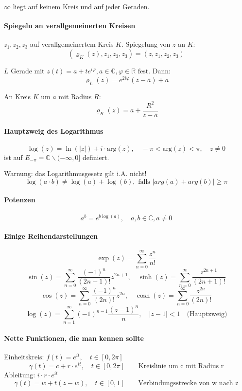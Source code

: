 \documentclass[a4paper, 10pt, DIV20, headings=small]{scrartcl}
\theoremstyle{definition}
\theoremstyle{plain}
\begin{document}
$\infty$ liegt auf keinem Kreis und auf jeder Geraden.

\paragraph{Spiegeln an verallgemeinerten Kreisen}
$z_1,z_2,z_3$ auf verallgemeinertem Kreis $K$. Spiegelung von $z$ an $K$:
$$(\varrho_K(z),z_1,z_3,z_3) = \overline{(z,z_1,z_2,z_3)}$$

$L$ Gerade mit $z(t) = a + t e^{i \varphi}, a \in \mathbb{C}, \varphi \in \mathbb{R} \text{ fest}$.
Dann:
$$\varrho_L(z) = e^{2 i \varphi} (\overline{z} - \overline{a}) + a$$

An Kreis $K$ um $a$ mit Radius $R$:
$$\varrho_K(z) = a + \frac{R^2}{\overline{z}- \overline{a}}$$

\paragraph{Hauptzweig des Logarithmus}
$$\log(z) = \ln(|z|) + i \cdot \text{arg}(z), \quad -\pi < \text{arg}(z) < \pi, \quad z \neq 0$$
ist auf $E_{- \pi} = \mathbb{C} \backslash (-\infty,0]$ definiert.

Warnung: das Logarithmusgesetz gilt i.A. nicht!
$$\log(a \cdot b) \neq \log(a) + \log(b), \text{ falls } |arg(a)+arg(b)| \geq \pi$$

\paragraph{Potenzen}
$$a^b = e^{b \log (a)}, \quad a,b \in \mathbb{C}, a \neq 0$$

\paragraph{Einige Reihendarstellungen}
$$\exp(z) = \sum\limits_{n=0}^\infty{\frac{z^n}{n!}}$$
$$\sin(z) = \sum\limits_{n=0}^\infty{\frac{(-1)^n}{(2n+1)!} z^{2n+1}}, \quad \sinh(z) = \sum\limits_{n=0}^\infty{\frac{z^{2n+1}}{(2n+1)!}}$$
$$\cos(z) = \sum\limits_{n=0}^\infty{\frac{(-1)^n}{(2n)!} z^{2n}}, \quad \cosh(z) = \sum\limits_{n=0}^\infty{\frac{z^{2n}}{(2n)!}}$$
$$\log(z) = \sum\limits_{n=1}^\infty{(-1)^{n-1} \frac{(z-1)^n}{n}}, \quad |z-1|<1 \quad \text{(Hauptzweig)}$$

\paragraph{Nette Funktionen, die man kennen sollte}
Einheitskreis: $f(t)=e^{it}, \quad t \in [0,2\pi]$
$$\gamma(t) = c + r \cdot e^{it}, \quad t \in [0,2\pi] \qquad \text{Kreislinie um c mit Radius r}$$ Ableitung: $i \cdot r \cdot e^{it}$
$$\gamma(t) =w+ t(z-w), \quad t \in [0,1] \qquad \text{Verbindungsstrecke von w nach z}$$
\end{document}
